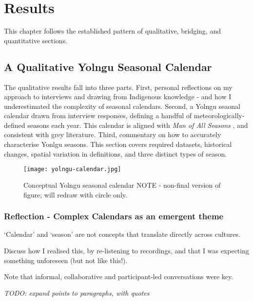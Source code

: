 \chapter{Results}
\label{ch:results}

This chapter follows the established pattern of qualitative,
bridging, and quantitative sections.


\section{A Qualitative Yolngu Seasonal Calendar}

The qualitative results fall into three parts.
%
First, personal reflections on my approach to interviews and drawing
from Indigenous knowledge - and how I underestimated the complexity
of seasonal calendars.
%
Second, a Yolngu seaonal calendar drawn from interview responses,
defining a handful of meteorologically-defined seasons each year.
This calendar is aligned with \textit{Man of All Seasons} \citep{davis1989},
and consistent with grey literature.
%
Third, commentary on how to accurately characterise Yonlgu seasons.
This section covers required datasets, historical changes, spatial
variation in definitions, and three distinct types of season.



\begin{figure}[h]
    \centering
    \texttt{[image: yolngu-calendar.jpg]}
    \caption{Conceptual Yolngu seasonal calendar \citep{davis1989}
        NOTE - non-final version of figure; will redraw with circle only.}
    \label{fig:yolngu-seasons}
\end{figure}


\subsection{Reflection - Complex Calendars as an emergent theme}

`Calendar' and `season' are not concepts that translate directly across cultures. 

Discuss how I realised this, by re-listening to recordings, and that I was
expecting something unforeseen (but not like this!).

Note that informal, collaborative and participant-led conversations were key.

\emph{TODO: expand points to paragraphs, with quotes}

